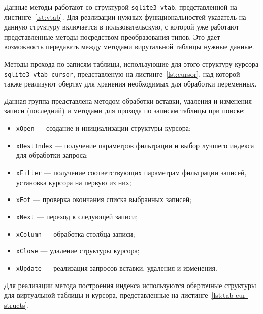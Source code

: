 
Данные методы работают со структурой \texttt{sqlite3\_vtab}, представленной на
листинге~\ref{lst:vtab}. Для реализации нужных функциональностей указатель на
данную структуру включается в пользовательскую, с которой уже работают
представленные методы посредством преобразования типов. Это дает возможность
передавать между методами вирутальной таблицы нужные данные.


Методы прохода по записям таблицы, использующие для этого структуру курсора
\texttt{sqlite3\_vtab\_cursor}, представленую на листинге~\ref{lst:cursor}, над
которой также реализуют обертку для хранения необходимых для обработки
переменных.


Данная группа представлена методом обработки вставки, удаления и
изменения записи (последний) и методами для прохода по записям таблицы
при поиске:
\begin{itemize}
    \item \texttt{xOpen} --- создание и инициализации структуры курсора;
    \item \texttt{xBestIndex} --- получение параметров фильтрации и
        выбор лучшего индекса для обработки запроса;
    \item \texttt{xFilter} --- получение соответствующих параметрам
        фильтрации записей, установка курсора на первую из них;
    \item \texttt{xEof} --- проверка окончания списка выбранных записей;
    \item \texttt{xNext} --- переход к следующей записи;
    \item \texttt{xColumn} --- обработка столбца записи;
    \item \texttt{xClose} --- удаление структуры курсора;
    \item \texttt{xUpdate} --- реализация запросов вставки, удаления и
        изменения.
\end{itemize}

Для реализации метода построения индекса используются оберточные структуры для
виртуальной таблицы и курсора, представленные на
листинге~\ref{lst:tab-cur-structs}.

